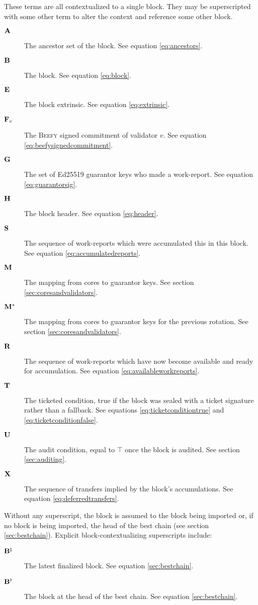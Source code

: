 These terms are all contextualized to a single block. They may be superscripted with some other term to alter the context and reference some other block.
\begin{description}
  \item[$\mathbf{A}$] The ancestor set of the block. See equation \ref{eq:ancestors}.
  \item[$\mathbf{B}$] The block. See equation \ref{eq:block}.
  \item[$\mathbf{E}$] The block extrinsic. See equation \ref{eq:extrinsic}.
  \item[$\mathbf{F}_{v}$] The \textsc{Beefy} signed commitment of validator $v$. See equation \ref{eq:beefysignedcommitment}.
  \item[$\mathbf{G}$] The set of Ed25519 guarantor keys who made a work-report. See equation \ref{eq:guarantorsig}.
  \item[$\mathbf{H}$] The block header. See equation \ref{eq:header}.
  \item[$\mathbf{S}$] The sequence of work-reports which were accumulated this in this block. See equation \ref{eq:accumulatedreports}.
  \item[$\mathbf{M}$] The mapping from cores to guarantor keys. See section \ref{sec:coresandvalidators}.
  \item[$\mathbf{M}^*$] The mapping from cores to guarantor keys for the previous rotation. See section \ref{sec:coresandvalidators}.
  \item[$\mathbf{R}$] The sequence of work-reports which have now become available and ready for accumulation. See equation \ref{eq:availableworkreports}.
  \item[$\mathbf{T}$] The ticketed condition, true if the block was sealed with a ticket signature rather than a fallback. See equations \ref{eq:ticketconditiontrue} and \ref{eq:ticketconditionfalse}.
  \item[$\mathbf{U}$] The audit condition, equal to $\top$ once the block is audited. See section \ref{sec:auditing}.
  \item[$\mathbf{X}$] The sequence of transfers implied by the block's accumulations. See equation \ref{eq:deferredtransfers}.\\
\end{description}

Without any superscript, the block is assumed to the block being imported or, if no block is being imported, the head of the best chain (see section \ref{sec:bestchain}). Explicit block-contextualizing superscripts include:
\begin{description}
  \item[$\mathbf{B}^\natural$] The latest finalized block. See equation \ref{sec:bestchain}.
  \item[$\mathbf{B}^\flat$] The block at the head of the best chain. See equation \ref{sec:bestchain}.
\end{description}

